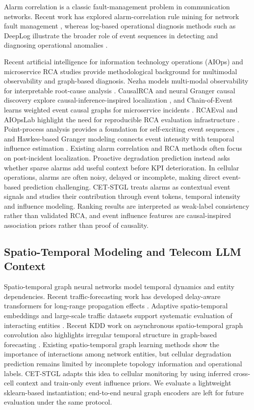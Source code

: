 Alarm correlation is a classic fault-management problem in communication networks. Recent work has explored alarm-correlation rule mining for network fault management \cite{fournierViger2021alarmrules}, whereas log-based operational diagnosis methods such as DeepLog illustrate the broader role of event sequences in detecting and diagnosing operational anomalies \cite{du2017deeplog}.

Recent artificial intelligence for information technology operations (AIOps) and microservice RCA studies provide methodological background for multimodal observability and graph-based diagnosis. Nezha models multi-modal observability for interpretable root-cause analysis \cite{yu2023nezha}. CausalRCA and neural Granger causal discovery explore causal-inference-inspired localization \cite{xin2023causalrca,lin2024run}, and Chain-of-Event learns weighted event causal graphs for microservice incidents \cite{yao2024chainofevent}. RCAEval and AIOpsLab highlight the need for reproducible RCA evaluation infrastructure \cite{pham2025rcaeval,ma2025aiopslab}. Point-process analysis provides a foundation for self-exciting event sequences \cite{ogata1988pointprocess}, and Hawkes-based Granger modeling connects event intensity with temporal influence estimation \cite{xu2016grangerhawkes}. Existing alarm correlation and RCA methods often focus on post-incident localization. Proactive degradation prediction instead asks whether sparse alarms add useful context before KPI deterioration. In cellular operations, alarms are often noisy, delayed or incomplete, making direct event-based prediction challenging. CET-STGL treats alarms as contextual event signals and studies their contribution through event tokens, temporal intensity and influence modeling. Ranking results are interpreted as weak-label consistency rather than validated RCA, and event influence features are causal-inspired association priors rather than proof of causality.

\subsection{Spatio-Temporal Modeling and Telecom LLM Context}

Spatio-temporal graph neural networks model temporal dynamics and entity dependencies. Recent traffic-forecasting work has developed delay-aware transformers for long-range propagation effects \cite{jiang2023pdformer}. Adaptive spatio-temporal embeddings and large-scale traffic datasets support systematic evaluation of interacting entities \cite{liu2023staeformer,liu2023largest}. Recent KDD work on asynchronous spatio-temporal graph convolution also highlights irregular temporal structure in graph-based forecasting \cite{zhang2024aseer}. Existing spatio-temporal graph learning methods show the importance of interactions among network entities, but cellular degradation prediction remains limited by incomplete topology information and operational labels. CET-STGL adapts this idea to cellular monitoring by using inferred cross-cell context and train-only event influence priors. We evaluate a lightweight sklearn-based instantiation; end-to-end neural graph encoders are left for future evaluation under the same protocol.

